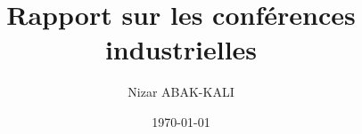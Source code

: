 \documentclass[a4paper,12pt,final]{article}
\title{Rapport sur les conférences industrielles}
\author{Nizar ABAK-KALI}
\date{\today}
\begin{document}


\cleardoublepage %

\tableofcontents
\sloppy

\cleardoublepage 



\cleardoublepage



\cleardoublepage



\cleardoublepage



\cleardoublepage



\cleardoublepage



\cleardoublepage



\cleardoublepage
\end{document}

